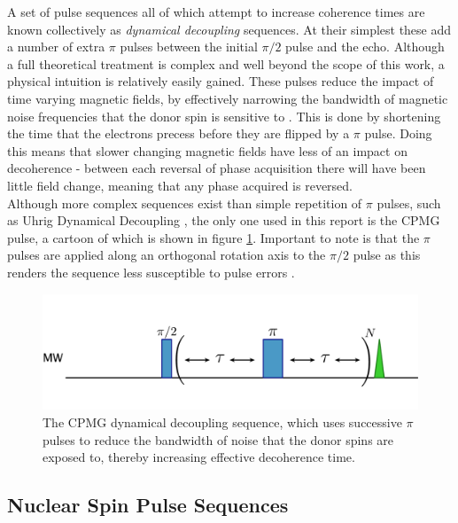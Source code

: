 A set of pulse sequences all of which attempt to increase coherence times are known collectively as \emph{dynamical decoupling} sequences.
At their simplest these add a number of extra $\pi$ pulses between the initial $\pi/2$ pulse and the echo.
Although a full theoretical treatment is complex and well beyond the scope of this work, a physical intuition is relatively easily gained.
These pulses reduce the impact of time varying magnetic fields, by effectively narrowing the bandwidth of magnetic noise frequencies that the donor spin is sensitive to \cite{Wang2009}.
This is done by shortening the time that the electrons precess before they are flipped by a $\pi$ pulse.
Doing this means that slower changing magnetic fields have less of an impact on decoherence - between each reversal of phase acquisition there will have been little field change, meaning that any phase acquired is reversed.
\\
Although more complex sequences exist than simple repetition of $\pi$ pulses, such as Uhrig Dynamical Decoupling \cite{Uhrig2008}, the only one used in this report is the CPMG pulse, a cartoon of which is shown in figure \ref{fig:CPMGpulse}.
Important to note is that the $\pi$ pulses are applied along an orthogonal rotation axis to the $\pi/2$ pulse as this renders the sequence less susceptible to pulse errors \cite{Carr1954,Meiboom1958}.


\begin{figure}
\centering
\includegraphics[width=\columnwidth]{Figures/CPMG.pdf}
\caption[CPMG pulse sequence]{The CPMG dynamical decoupling sequence, which uses successive $\pi$ pulses to reduce the bandwidth of noise that the donor spins are exposed to, thereby increasing effective decoherence time.}
\label{fig:CPMGpulse}
\end{figure}

\subsection{Nuclear Spin Pulse Sequences}

